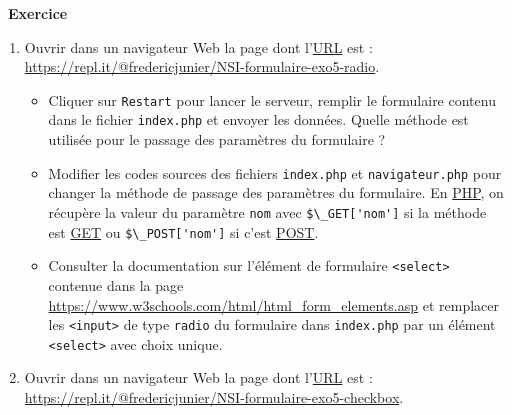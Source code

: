 \documentclass[
  11pt,
]{article}
\newcommand{\passthrough}[1]{#1}
\providecommand{\tightlist}{%
  \setlength{\itemsep}{0pt}\setlength{\parskip}{0pt}}
\newcounter{exo}
\newenvironment{exercice}[1]
{\par \medskip   \addtocounter{exo}{1} \noindent  
\begin{bclogo}[arrondi =0.1,   noborder = true, logo=\bccrayon, marge=4]{~\textbf{Exercice} \textbf{\theexo} {\itshape #1} }  \par}
{
\end{bclogo}
 \par \bigskip }
\newcounter{def}
\begin{document}
\begin{exercice}{}

\begin{enumerate}
\def\labelenumi{\arabic{enumi}.}
\item
  Ouvrir dans un navigateur Web la page dont
  l'\href{https://developer.mozilla.org/fr/docs/Glossaire/URL}{URL} est
  :\\
  \url{https://repl.it/@fredericjunier/NSI-formulaire-exo5-radio}.

  \begin{itemize}
  \tightlist
  \item
    Cliquer sur \passthrough{\lstinline!Restart!} pour lancer le
    serveur, remplir le formulaire contenu dans le fichier
    \passthrough{\lstinline!index.php!} et envoyer les données. Quelle
    méthode est utilisée pour le passage des paramètres du formulaire ?
  \item
    Modifier les codes sources des fichiers
    \passthrough{\lstinline!index.php!} et
    \passthrough{\lstinline!navigateur.php!} pour changer la méthode de
    passage des paramètres du formulaire. En
    \href{https://developer.mozilla.org/fr/docs/Glossaire/PHP}{PHP}, on
    récupère la valeur du paramètre \passthrough{\lstinline!nom!} avec
    \passthrough{\lstinline!$\_GET['nom']!} si la méthode est
    \href{https://developer.mozilla.org/fr/docs/Web/HTTP/M\%C3\%A9thode/GET}{GET}
    ou \passthrough{\lstinline!$\_POST['nom']!} si c'est
    \href{https://developer.mozilla.org/fr/docs/Web/HTTP/M\%C3\%A9thode/POST}{POST}.
  \item
    Consulter la documentation sur l'élément de formulaire
    \passthrough{\lstinline!<select>!} contenue dans la page
    \url{https://www.w3schools.com/html/html_form_elements.asp} et
    remplacer les \passthrough{\lstinline!<input>!} de type
    \passthrough{\lstinline!radio!} du formulaire dans
    \passthrough{\lstinline!index.php!} par un élément
    \passthrough{\lstinline!<select>!} avec choix unique.
  \end{itemize}
\item
  Ouvrir dans un navigateur Web la page dont
  l'\href{https://developer.mozilla.org/fr/docs/Glossaire/URL}{URL} est
  :\\
  \url{https://repl.it/@fredericjunier/NSI-formulaire-exo5-checkbox}.


\end{enumerate}
\end{exercice}
\end{document}
